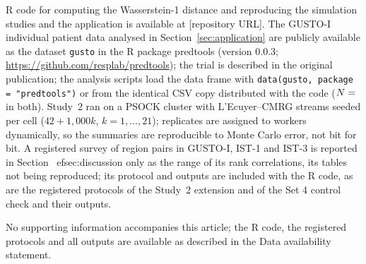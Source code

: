 \documentclass[AMA,Times1COL]{WileyNJDv5}
\begin{document}
R code for computing the Wasserstein-1 distance and reproducing the simulation studies and the application is available at [repository URL]. The GUSTO-I individual patient data analysed in Section~\ref{sec:application} are publicly available as the dataset \texttt{gusto} in the R package predtools (version 0.0.3; \url{https://github.com/resplab/predtools}); the trial is described in the original publication;\cite{gusto1993} the analysis scripts load the data frame with \texttt{data(gusto, package = "predtools")} or from the identical CSV copy distributed with the code ($N = \numval{gustoN}$ in both). Study~2 ran on a PSOCK cluster with L'Ecuyer--CMRG streams seeded per cell ($42 + 1{,}000k$, $k = 1, \ldots, 21$); replicates are assigned to workers dynamically, so the summaries are reproducible to Monte Carlo error, not bit for bit. A registered survey of region pairs in GUSTO-I, IST-1 and IST-3 is reported in Section~
ef{sec:discussion} only as the range of its rank correlations, its tables not being reproduced; its protocol and outputs are included with the R code, as are the registered protocols of the Study~2 extension and of the Set 4 control check and their outputs.




No supporting information accompanies this article; the R code, the registered protocols and all outputs are available as described in the Data availability statement.

\appendix

\end{document}
